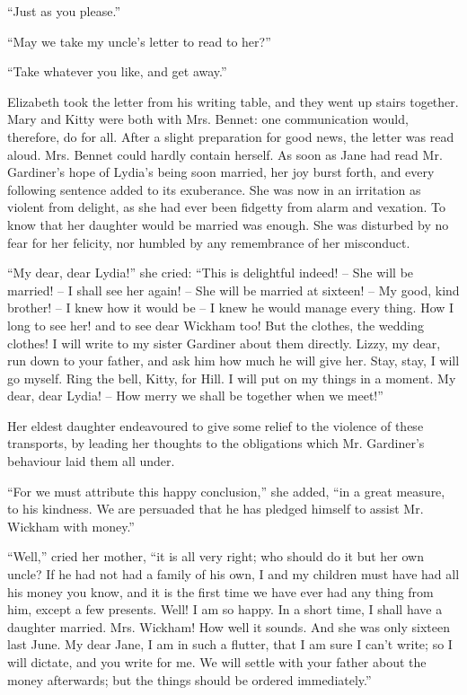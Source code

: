 “Just as you please.”

“May we take my uncle’s letter to read to her?”

“Take whatever you like, and get away.”

Elizabeth took the letter from his writing table, and
they went up stairs together. Mary and Kitty were both
with Mrs. Bennet: one communication would, therefore,
do for all. After a slight preparation for good news, the
letter was read aloud. Mrs. Bennet could hardly contain
herself. As soon as Jane had read Mr. Gardiner’s hope
of Lydia’s being soon married, her joy burst forth, and
every following sentence added to its exuberance. She
was now in an irritation as violent from delight, as she
had ever been fidgetty from alarm and vexation. To know
that her daughter would be married was enough. She
was disturbed by no fear for her felicity, nor humbled
by any remembrance of her misconduct.

“My dear, dear Lydia!” she cried: “This is delightful
indeed! -- She will be married! -- I shall see her again! -- She
will be married at sixteen! -- My good, kind brother! -- I
knew how it would be -- I knew he would manage every
thing. How I long to see her! and to see dear Wickham
too! But the clothes, the wedding clothes! I will write
to my sister Gardiner about them directly. Lizzy, my
dear, run down to your father, and ask him how much
he will give her. Stay, stay, I will go myself. Ring the
bell, Kitty, for Hill. I will put on my things in a moment.
My dear, dear Lydia! -- How merry we shall be together
when we meet!”

Her eldest daughter endeavoured to give some relief to
the violence of these transports, by leading her thoughts
to the obligations which Mr. Gardiner’s behaviour laid
them all under.

“For we must attribute this happy conclusion,” she
added, “in a great measure, to his kindness. We are
persuaded that he has pledged himself to assist Mr. Wickham
with money.”

“Well,” cried her mother, “it is all very right; who
should do it but her own uncle? If he had not had
a family of his own, I and my children must have had all
his money you know, and it is the first time we have ever
had any thing from him, except a few presents. Well!
I am so happy. In a short time, I shall have a daughter
married. Mrs. Wickham! How well it sounds. And she
was only sixteen last June. My dear Jane, I am in such
a flutter, that I am sure I can’t write; so I will dictate,
and you write for me. We will settle with your father
about the money afterwards; but the things should be
ordered immediately.”

